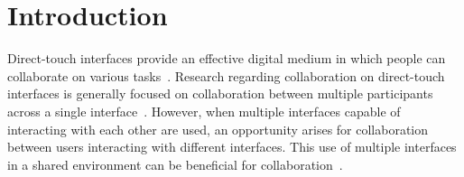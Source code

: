 \documentclass{bmcart}
\begin{document}
\begin{frontmatter}
\begin{abstractbox}

\begin{keyword}
\end{keyword}


\end{abstractbox}
%

\end{frontmatter}




\section*{Introduction}\label{sec:intro}

Direct-touch interfaces provide an effective digital medium in which people can collaborate on various tasks~\cite{Marshall2008}. 
Research regarding collaboration on direct-touch interfaces is generally focused on collaboration between multiple participants across a single interface~\cite{Piper2009,Rick2009,Ryall2006a}. 
However, when multiple interfaces capable of interacting with each other are used, an opportunity arises for collaboration between users interacting with different interfaces.
This use of multiple interfaces in a shared environment can be beneficial for collaboration~\cite{Wallace2008a,Wallace2009}.
\end{document}
